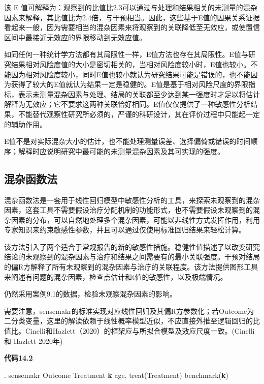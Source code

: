 \documentclass[
  chinese-hans,
  letterpaper,
  DIV=11,
  numbers=noendperiod]{scrreprt}
\newenvironment{Shaded}{\begin{snugshade}}{\end{snugshade}}
\newcommand{\KeywordTok}[1]{\textcolor[rgb]{0.00,0.23,0.31}{\textbf{#1}}}
\newcommand{\NormalTok}[1]{\textcolor[rgb]{0.00,0.23,0.31}{#1}}
\begin{document}
该 E
值可解释为：观察到的比值比2.3可以通过与处理和结果相关的未测量的混杂因素来解释，其比值比为2.4倍，与干预相当。因此，这些基于E值的因果关系证据看起来一般，因为需要相当的混杂因素来将观察到的关联降低至无效应，或使置信区间中最接近无效应的界限移动到无效应值。

如同任何一种统计学方法都有其局限性一样，E值方法也存在其局限性。E值与研究结果相对风险度值的大小是密切相关的，当相对风险度较小时，E值也较小。不能因为相对风险度较小，同时E值也较小就认为研究结果可能是错误的，也不能因为获得了较大的E值就认为结果一定是稳健的。E值是基于相对风险尺度的界限指标，表示未测量混杂因素与处理、结局的关联都至少达到某一强度时才足以将估计解释为无效应；它不要求这两种关联恰好相同。E值仅仅提供了一种敏感性分析结果，不能替代观察性研究所必须的，严谨的科研设计，其在评价过程中只能起一定的辅助作用。

E值不是对实际混杂大小的估计，也不能处理测量误差、选择偏倚或错误的时间顺序；解释时应说明研究中最可能的未测量混杂因素及其可实现的强度。

\subsection{混杂函数法}\label{ux6df7ux6742ux51fdux6570ux6cd5}

混杂函数法是一套用于线性回归模型中敏感性分析的工具，来探索未观察到的混杂因素，这套工具不需要假设治疗分配机制的功能形式，也不需要假设未观察到的混杂因素的分布，可以自然地处理多个混杂因素，可能以非线性方式发挥作用，利用专家知识来约束敏感性参数，并且可以通过仅使用标准回归结果来轻松计算。

该方法引入了两个适合于常规报告的新的敏感性措施。稳健性值描述了以改变研究结论的未观察到的混杂因素与治疗和结果之间需要有的最小关联强度。干预对结局的偏R方解释了所有未观察到的混杂因素与治疗的关联程度。该方法提供图形工具来阐述有问题的混杂因素，检查点估计和t值的敏感性，以及极端情况。

仍然采用案例9.1的数据，检验未观察混杂因素的影响。

需要注意，sensemakr的标准实现对应线性回归及其偏R方参数化；若Outcome为二分类变量，这里的解读依赖于线性概率模型近似，不应直接外推至逻辑回归的比值比。Cinelli和Hazlett（2020）的框架应与所拟合模型及效应尺度一致。(Cinelli
和 Hazlett 2020年)

\begin{tcolorbox}[enhanced jigsaw, arc=.35mm, bottomrule=.15mm, breakable, colback=white, colframe=quarto-callout-note-color-frame, left=2mm, leftrule=.75mm, opacityback=0, rightrule=.15mm, toprule=.15mm]

\vspace{-3mm}\textbf{代码14.2}\vspace{3mm}

\begin{Shaded}
\begin{Highlighting}[]
\NormalTok{. sensemakr Outcome Treatment }\KeywordTok{k}\NormalTok{ age, treat(Treatment) benchmark(}\KeywordTok{k}\NormalTok{)}
\end{Highlighting}
\end{Shaded}

\end{tcolorbox}
\end{document}
